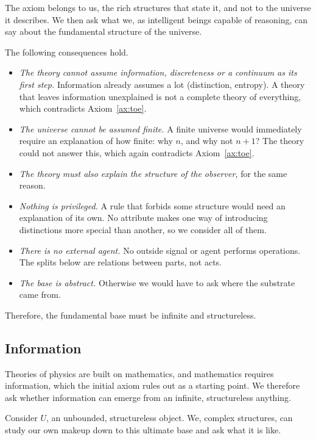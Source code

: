 \documentclass[11pt]{book}
\begin{document}
The axiom belongs to us, the rich structures that state it, and not to the
universe it describes. We then ask what we, as intelligent beings capable of
reasoning, can say about the fundamental structure of the universe.

The following consequences hold.

\begin{itemize}
  \item \emph{The theory cannot assume information, discreteness or a continuum
        as its first step.} Information already assumes a lot (distinction,
        entropy). A theory that leaves information unexplained is not a complete
        theory of everything, which contradicts Axiom~\ref{ax:toe}.
  \item \emph{The universe cannot be assumed finite.} A finite universe would
        immediately require an explanation of how finite: why $n$, and why not
        $n + 1$? The theory could not answer this, which again contradicts
        Axiom~\ref{ax:toe}.
  \item \emph{The theory must also explain the structure of the observer,} for the
        same reason.
  \item \emph{Nothing is privileged.} A rule that forbids some structure would
        need an explanation of its own. No attribute makes one way of introducing
        distinctions more special than another, so we consider all of them.
  \item \emph{There is no external agent.} No outside signal or agent performs
        operations. The splits below are relations between parts, not acts.
  \item \emph{The base is abstract.} Otherwise we would have to ask where the
        substrate came from.
\end{itemize}

Therefore, the fundamental base must be infinite and structureless.

\subsection{Information}

Theories of physics are built on mathematics, and mathematics requires information,
which the initial axiom rules out as a starting point. We therefore ask whether
information can emerge from an infinite, structureless anything.

Consider $U$, an unbounded, structureless object. We, complex structures, can
study our own makeup down to this ultimate base and ask what it is like.
\end{document}
